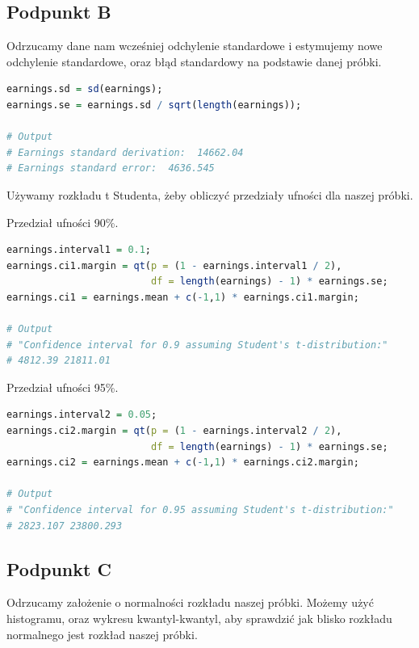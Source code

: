 \documentclass[11pt]{article}
\begin{document}
\pagebreak

\subsection{Podpunkt B}
Odrzucamy dane nam wcześniej odchylenie standardowe i estymujemy nowe odchylenie standardowe,
oraz błąd standardowy na podstawie danej próbki.

\begin{lstlisting}[language=R]
earnings.sd = sd(earnings);
earnings.se = earnings.sd / sqrt(length(earnings));

# Output
# Earnings standard derivation:  14662.04 
# Earnings standard error:  4636.545 
\end{lstlisting}

Używamy rozkładu t Studenta, żeby obliczyć przedziały ufności dla naszej próbki.

Przedział ufności 90\%.

\begin{lstlisting}[language=R]
earnings.interval1 = 0.1;
earnings.ci1.margin = qt(p = (1 - earnings.interval1 / 2),
                         df = length(earnings) - 1) * earnings.se;
earnings.ci1 = earnings.mean + c(-1,1) * earnings.ci1.margin;

# Output
# "Confidence interval for 0.9 assuming Student's t-distribution:"
# 4812.39 21811.01
\end{lstlisting}

Przedział ufności 95\%.

\begin{lstlisting}[language=R]
earnings.interval2 = 0.05;
earnings.ci2.margin = qt(p = (1 - earnings.interval2 / 2),
                         df = length(earnings) - 1) * earnings.se;
earnings.ci2 = earnings.mean + c(-1,1) * earnings.ci2.margin;

# Output
# "Confidence interval for 0.95 assuming Student's t-distribution:"
# 2823.107 23800.293
\end{lstlisting}

\pagebreak

\subsection{Podpunkt C}
Odrzucamy założenie o normalności rozkładu naszej próbki. Możemy użyć histogramu,
oraz wykresu kwantyl-kwantyl, aby sprawdzić jak blisko rozkładu normalnego jest
rozkład naszej próbki.
\end{document}
